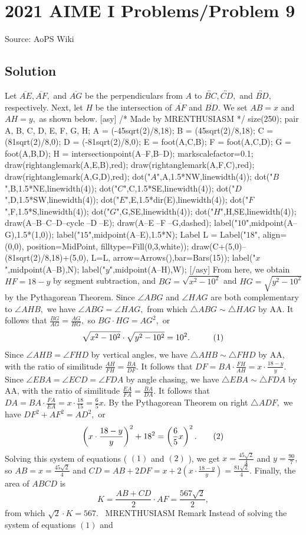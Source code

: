 \documentclass[12pt]{article}
\begin{document}
\section*{{2021 AIME I Problems/Problem 9}}
Source: AoPS Wiki

\subsection*{Solution}
Let $\overline{AE}, \overline{AF},$ and $\overline{AG}$ be the perpendiculars from $A$ to $\overleftrightarrow{BC}, \overleftrightarrow{CD},$ and $\overleftrightarrow{BD},$ respectively. Next, let $H$ be the intersection of $\overline{AF}$ and $\overline{BD}.$ We set $AB=x$ and $AH=y,$ as shown below. [asy] /* Made by MRENTHUSIASM */ size(250); pair A, B, C, D, E, F, G, H; A = (-45sqrt(2)/8,18); B = (45sqrt(2)/8,18); C = (81sqrt(2)/8,0); D = (-81sqrt(2)/8,0); E = foot(A,C,B); F = foot(A,C,D); G = foot(A,B,D); H = intersectionpoint(A--F,B--D); markscalefactor=0.1; draw(rightanglemark(A,E,B),red); draw(rightanglemark(A,F,C),red); draw(rightanglemark(A,G,D),red); dot("$A$",A,1.5*NW,linewidth(4)); dot("$B$",B,1.5*NE,linewidth(4)); dot("$C$",C,1.5*SE,linewidth(4)); dot("$D$",D,1.5*SW,linewidth(4)); dot("$E$",E,1.5*dir(E),linewidth(4)); dot("$F$",F,1.5*S,linewidth(4)); dot("$G$",G,SE,linewidth(4)); dot("$H$",H,SE,linewidth(4)); draw(A--B--C--D--cycle^^B--D^^B--E); draw(A--E^^A--F^^A--G,dashed); label("$10$",midpoint(A--G),1.5*(1,0)); label("$15$",midpoint(A--E),1.5*N); Label L = Label("$18$", align=(0,0), position=MidPoint, filltype=Fill(0,3,white)); draw(C+(5,0)--(81sqrt(2)/8,18)+(5,0), L=L, arrow=Arrows(),bar=Bars(15)); label("$x$",midpoint(A--B),N); label("$y$",midpoint(A--H),W); [/asy] From here, we obtain $HF=18-y$ by segment subtraction, and $BG=\sqrt{x^2-10^2}$ and $HG=\sqrt{y^2-10^2}$ by the Pythagorean Theorem. Since $\angle ABG$ and $\angle HAG$ are both complementary to $\angle AHB,$ we have $\angle ABG = \angle HAG,$ from which $\triangle ABG \sim \triangle HAG$ by AA. It follows that $\frac{BG}{AG}=\frac{AG}{HG},$ so $BG\cdot HG=AG^2,$ or \[\sqrt{x^2-10^2}\cdot\sqrt{y^2-10^2}=10^2. \hspace{10mm} (1)\] Since $\angle AHB = \angle FHD$ by vertical angles, we have $\triangle AHB \sim \triangle FHD$ by AA, with the ratio of similitude $\frac{AH}{FH}=\frac{BA}{DF}.$ It follows that $DF=BA\cdot\frac{FH}{AH}=x\cdot\frac{18-y}{y}.$ Since $\angle EBA = \angle ECD = \angle FDA$ by angle chasing, we have $\triangle EBA \sim \triangle FDA$ by AA, with the ratio of similitude $\frac{EA}{FA}=\frac{BA}{DA}.$ It follows that $DA=BA\cdot\frac{FA}{EA}=x\cdot\frac{18}{15}=\frac{6}{5}x.$ By the Pythagorean Theorem on right $\triangle ADF,$ we have $DF^2+AF^2=AD^2,$ or \[\left(x\cdot\frac{18-y}{y}\right)^2+18^2=\left(\frac{6}{5}x\right)^2. \hspace{7mm} (2)\] Solving this system of equations ( $(1)$ and $(2)$ ), we get $x=\frac{45\sqrt2}{4}$ and $y=\frac{90}{7},$ so $AB=x=\frac{45\sqrt2}{4}$ and $CD=AB+2DF=x+2\left(x\cdot\frac{18-y}{y}\right)=\frac{81\sqrt2}{4}.$ Finally, the area of $ABCD$ is \[K=\frac{AB+CD}{2}\cdot AF=\frac{567\sqrt2}{2},\] from which $\sqrt2 \cdot K=\boxed{567}.$ ~MRENTHUSIASM Remark Instead of solving the system of equations $(1)$ and 
\end{document}
